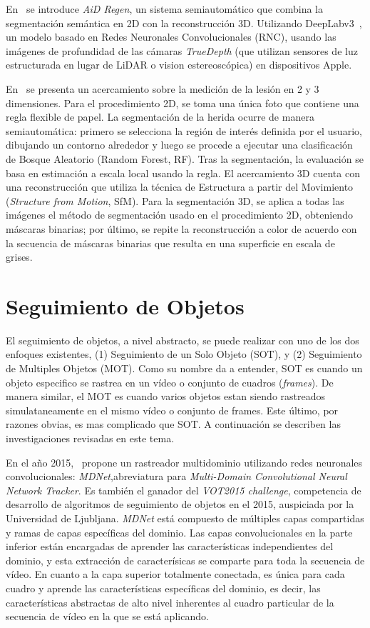 En~\cite{chae2022generating} se introduce \textit{AiD Regen}, un sistema semiautomático que combina la segmentación semántica en 2D con la reconstrucción 3D. Utilizando DeepLabv3~\cite{chen2017rethinking}, un modelo basado en Redes Neuronales Convolucionales (RNC), usando las imágenes de profundidad de las cámaras \textit{TrueDepth} (que utilizan sensores de luz estructurada en lugar de LiDAR o vision estereoscópica) en dispositivos Apple.

En~\cite{mirzaalian2019measuring} se presenta un acercamiento sobre la medición de la lesión en 2 y 3 dimensiones. Para el procedimiento 2D, se toma una única foto que contiene una regla flexible de papel. La segmentación de la herida ocurre de manera semiautomática: primero se selecciona la región de interés definida por el usuario, dibujando un contorno alrededor y luego se procede a ejecutar una clasificación de Bosque Aleatorio (Random Forest, RF). Tras la segmentación, la evaluación se basa en estimación a escala local usando la regla. El acercamiento 3D cuenta con una reconstrucción que utiliza la técnica de Estructura a partir del Movimiento (\textit{Structure from Motion}, SfM). Para la segmentación 3D, se aplica a todas las imágenes el método de segmentación usado en el procedimiento 2D, obteniendo máscaras binarias; por último, se repite la reconstrucción a color de acuerdo con la secuencia de máscaras binarias que resulta en una superficie en escala de grises.

\section{Seguimiento de Objetos}

El seguimiento de objetos, a nivel abstracto, se puede realizar con uno de los dos enfoques existentes, (1) Seguimiento de un Solo Objeto (SOT), y (2) Seguimiento de Multiples Objetos (MOT). Como su nombre da a entender, SOT es cuando un objeto especifico se rastrea en un vídeo o conjunto de cuadros (\textit{frames}). De manera similar, el MOT es cuando varios objetos estan siendo rastreados simulataneamente en el mismo vídeo o conjunto de frames. Este último, por razones obvias, es mas complicado que SOT. A continuación se describen las investigaciones revisadas en este tema.

En el año 2015,~\cite{nam2016learning} propone un rastreador multidominio utilizando redes neuronales convolucionales: \textit{MDNet},abreviatura para \textit{Multi-Domain Convolutional Neural Network Tracker}. Es también el ganador del \textit{VOT2015 challenge}, competencia de desarrollo de algoritmos de seguimiento de objetos en el 2015, auspiciada por la Universidad de Ljubljana. \textit{MDNet} está compuesto de múltiples capas compartidas y ramas de capas específicas del dominio. Las capas convolucionales en la parte inferior están encargadas de aprender las características independientes del dominio, y esta extracción de caracterísicas se comparte para toda la secuencia de vídeo. En cuanto a la capa superior totalmente conectada, es única para cada cuadro y aprende las características específicas del dominio, es decir, las características abstractas de alto nivel inherentes al cuadro particular de la secuencia de vídeo en la que se está aplicando.

